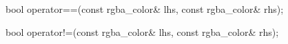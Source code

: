 %
%
\begin{itemdecl}
bool operator==(const rgba_color& lhs, const rgba_color& rhs);
\end{itemdecl}
\begin{itemdescr}
	\pnum
	\returns
\end{itemdescr}

%
%
\begin{itemdecl}
bool operator!=(const rgba_color& lhs, const rgba_color& rhs);
\end{itemdecl}
\begin{itemdescr}
	\pnum
	\returns
\end{itemdescr}
